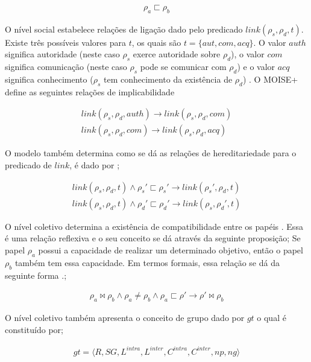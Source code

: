 \begin{eqnarray}\nonumber
\rho_a \sqsubset \rho_b
\end{eqnarray}

O nível social estabelece relações de ligação dado pelo predicado $link(\rho_s,\rho_d,t)$. Existe três possíveis valores para $t$, os quais são $t = \{aut, com, acq\}$. O valor $auth$ significa autoridade (neste caso $\rho_s$ exerce autoridade sobre $\rho_d$), o valor $com$ significa comunicação (neste caso $\rho_s$ pode se comunicar com $\rho_d$) e o valor $acq$ significa conhecimento 
($\rho_s$ tem conhecimento da existência de $\rho_d$) \cite{moiseframework} \cite{moiseframeworktwo} \cite{dynamicagenttemporalstruct}. O MOISE+ define as seguintes relações de implicabilidade

\begin{eqnarray}\nonumber
	link(\rho_s,\rho_d,auth) \to link(\rho_s,\rho_d,com) \nonumber \\
	link(\rho_s,\rho_d,com) \to link(\rho_s,\rho_d,acq) 
\end{eqnarray}

O modelo também determina como se dá as relações de hereditariedade para o predicado de $link$, é dado por \cite{moiseframework} \cite{dynamicagenttemporalstruct}; 

\begin{eqnarray}\nonumber
	link(\rho_s,\rho_d,t) \wedge \rho_s' \sqsubset \rho_s' \to link(\rho_s',\rho_d,t) \nonumber \\
	link(\rho_s,\rho_d,t) \wedge \rho_d' \sqsubset \rho_d' \to link(\rho_s,\rho_d',t) 	
\end{eqnarray}


O nível coletivo determina a existência de compatibilidade entre os papéis \cite{moiseframework}. Essa é uma relação reflexiva e o seu conceito se dá através da seguinte proposição; Se papel $\rho_a$ possui a capacidade de realizar um determinado objetivo, então o papel $\rho_b$ também tem essa capacidade. Em termos formais, essa relação se dá da seguinte forma \cite{moiseframework} \cite{deonticOne}.;

\begin{eqnarray}\nonumber
	\rho_a \bowtie \rho_b \wedge \rho_a \neq \rho_b \wedge \rho_a \sqsubset \rho' \to \rho' \bowtie \rho_b 
\end{eqnarray}

O nível coletivo também apresenta o conceito de grupo dado por $gt$ o qual é constituído por;

\begin{eqnarray}\nonumber
	gt = \langle R,SG,L^{intra},L^{inter},C^{intra},C^{inter},np,ng\rangle 
\end{eqnarray}

